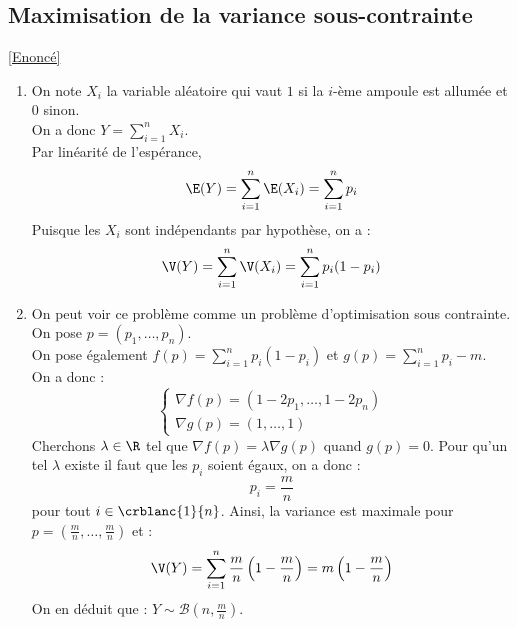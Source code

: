 \documentclass[8pt]{book}
\begin{document}
	\subsection{Maximisation de la variance sous-contrainte}
	\textcolor{blue}{\hyperref[Maximisation de la variance sous contrainte]{[Enoncé]}}\\
	\label{Maximisation de la variance sous contrainte corrigé}
	\begin{enumerate}[leftmargin=*]
		\item On note $X_i$ la variable aléatoire qui vaut $1$ si la $i$-ème ampoule est allumée et $0$ sinon.\\
		On a donc $\displaystyle Y=\sum_{i=1}^{n}X_i$.\\
		Par linéarité de l'espérance, \[\E(Y)=\sum_{i=1}^{n}\E(X_i)=\sum_{i=1}^{n}p_i\]
		Puisque les $X_i$ sont indépendants par hypothèse, on a : \[\V(Y)=\sum_{i=1}^{n}\V(X_i)=\sum_{i=1}^{n}p_i(1-p_i)\]
		\item On peut voir ce problème comme un problème d'optimisation sous contrainte.\\
		On pose $p=(p_1,\dots,p_n)$.\\
		On pose également $f(p)=\displaystyle\sum_{i=1}^{n}p_i(1-p_i)$ et $g(p)=\displaystyle\sum_{i=1}^{n}p_i-m$.\\
		On a donc : \[\begin{cases}
			\nabla f(p)=(1-2p_1,\dots, 1-2p_n)\\
			\nabla g(p)=(1,\dots, 1)
		\end{cases}\]
		Cherchons $\lambda\in\R$ tel que $\nabla f(p)=\lambda \nabla g(p)$ quand $g(p)=0$.
		Pour qu'un tel $\lambda$ existe il faut que les $p_i$ soient égaux, on a donc : \[p_i=\frac{m}{n}\]
		pour tout $i\in\crblanc{1}{n}$.
		Ainsi, la variance est maximale pour $p=\left(\frac{m}{n},\dots,\frac{m}{n}\right)$ et : \[\V(Y)=\sum_{i=1}^n\frac{m}{n}\left(1-\frac{m}{n}\right)=m\left(1-\frac{m}{n}\right)\]
		On en déduit que : $Y\sim \mathcal{B}\left(n,\frac{m}{n}\right)$.
	\end{enumerate}
\end{document}
